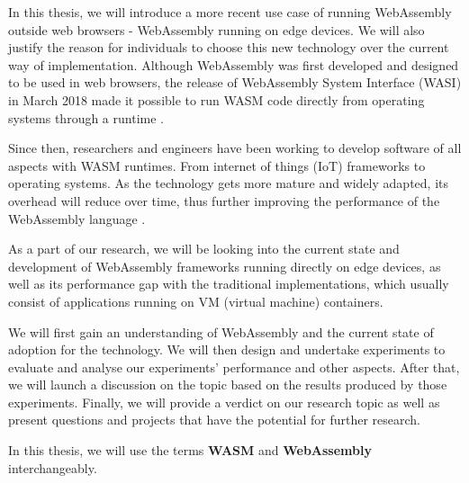 In this thesis, we will introduce a more recent use case of running WebAssembly outside web browsers - WebAssembly running on edge devices. We will also justify the reason for individuals to choose this new technology over the current way of implementation. Although WebAssembly was first developed and designed to be used in web browsers, the release of WebAssembly System Interface (WASI) in March 2018 made it possible to run WASM code directly from operating systems through a runtime \cite{abs12}.

Since then, researchers and engineers have been working to develop software of all aspects with WASM runtimes. From internet of things (IoT) frameworks to operating systems. As the technology gets more mature and widely adapted, its overhead will reduce over time, thus further improving the performance of the WebAssembly language \cite{abs13}.

As a part of our research, we will be looking into the current state and development of WebAssembly frameworks running directly on edge devices, as well as its performance gap with the traditional implementations, which usually consist of applications running on VM (virtual machine) containers.

We will first gain an understanding of WebAssembly and the current state of adoption for the technology. We will then design and undertake experiments to evaluate and analyse our experiments' performance and other aspects. After that, we will launch a discussion on the topic based on the results produced by those experiments. Finally, we will provide a verdict on our research topic as well as present questions and projects that have the potential for further research.

\bigskip

In this thesis, we will use the terms \textbf{WASM} and \textbf{WebAssembly} interchangeably.
